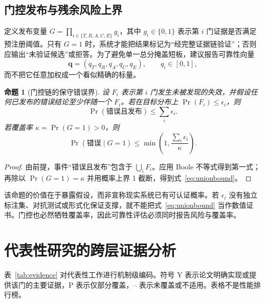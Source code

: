 \documentclass[UTF8,11pt,a4paper,fontset=fandol]{ctexart}
\newtheorem{proposition}{命题}
\begin{document}
\subsection{门控发布与残余风险上界}
定义发布变量 $G=\prod_{i\in\{T,R,A,C,E\}} g_i$，其中 $g_i\in\{0,1\}$ 表示第 $i$ 门证据是否满足预注册阈值。只有 $G=1$ 时，系统才能把结果标记为“经完整证据链验证”；否则应输出“未验证候选”或拒答。为了避免单一总分掩盖短板，建议报告可靠性向量
\begin{equation}
\bm{q}=(q_T,q_R,q_A,q_C,q_E),\qquad q_i\in[0,1],
\end{equation}
而不把它任意加权成一个看似精确的标量。

\begin{proposition}[门控链的保守错误界]
设 $F_i$ 表示第 $i$ 门发生未被发现的失效，并假设任何已发布的错误结论至少伴随一个 $F_i$。若在目标分布上 $\Pr(F_i)\leq\epsilon_i$，则
\begin{equation}
\Pr(\text{错误且发布})\leq \sum_i\epsilon_i.
\end{equation}
若覆盖率 $\kappa=\Pr(G=1)>0$，则
\begin{equation}
\Pr(\text{错误}\mid G=1)\leq \min\left(1,\frac{\sum_i\epsilon_i}{\kappa}\right).
\label{eq:unionbound}
\end{equation}
\end{proposition}
\begin{proof}
由前提，事件“错误且发布”包含于 $\bigcup_i F_i$。应用 Boole 不等式得到第一式；再除以 $\Pr(G=1)=\kappa$ 并用概率上界 1 截断，得到式~\eqref{eq:unionbound}。
\end{proof}

该命题的价值在于暴露假设，而非宣称现实系统已有可认证概率。若 $\epsilon_i$ 没有独立标注集、对抗测试或形式化保证支撑，就不能把式~\eqref{eq:unionbound} 当作数值证书。门控也必然牺牲覆盖率，因此可靠性评估必须同时报告风险与覆盖率。

\section{代表性研究的跨层证据分析}
表~\ref{tab:evidence} 对代表性工作进行机制级编码。符号 Y 表示论文明确实现或提供该门的主要证据，P 表示仅部分覆盖，-- 表示未覆盖或不适用。表格不是性能排行榜。
\end{document}

